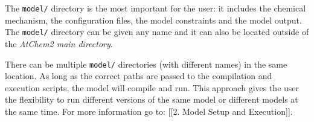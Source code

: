 The \texttt{model/} directory is the most important for the user: it
includes the chemical mechanism, the configuration files, the model
constraints and the model output. The \texttt{model/} directory can be
given any name and it can also be located outside of the \emph{AtChem2
  main directory}.

There can be multiple \texttt{model/} directories (with different
names) in the same location. As long as the correct paths are passed
to the compilation and execution scripts, the model will compile and
run. This approach gives the user the flexibility to run different
versions of the same model or different models at the same time. For
more information go to: {[}{[}2. Model Setup and Execution{]}{]}.
